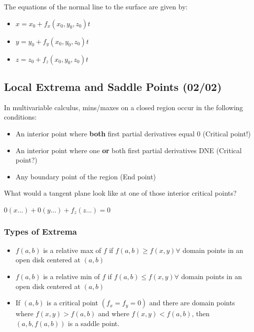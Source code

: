 \documentclass[
  letterpaper,
  DIV=11,
  numbers=noendperiod]{scrartcl}
\providecommand{\tightlist}{%
  \setlength{\itemsep}{0pt}\setlength{\parskip}{0pt}}\usepackage{longtable,booktabs,array}
\begin{document}
The equations of the normal line to the surface are given by:

\begin{itemize}
\tightlist
\item
  \(x = x_0 + f_x(x_0, y_0, z_0)t\)
\item
  \(y = y_0 + f_y(x_0, y_0, z_0)t\)
\item
  \(z = z_0 + f_z(x_0, y_0, z_0)t\)
\end{itemize}

\newpage{}

\subsection{Local Extrema and Saddle Points
(02/02)}\label{local-extrema-and-saddle-points-0202}

In multivariable calculus, mins/maxes on a closed region occur in the
following conditions:

\begin{itemize}
\tightlist
\item
  An interior point where \textbf{both} first partial derivatives equal
  0 (Critical point!)
\item
  An interior point where one \textbf{or} both first partial derivatives
  DNE (Critical point?)
\item
  Any boundary point of the region (End point)
\end{itemize}

What would a tangent plane look like at one of those interior critical
points?

\(0(x...) + 0(y...)+f_z(z...) = 0\)

\subsubsection{Types of Extrema}\label{types-of-extrema}

\begin{itemize}
\tightlist
\item
  \(f(a, b)\) is a relative max of \(f\) if
  \(f(a, b) \ge f(x, y) \forall\) domain points in an open disk centered
  at \((a, b)\)
\item
  \(f(a, b)\) is a relative min of \(f\) if
  \(f(a, b) \le f(x, y) \forall\) domain points in an open disk centered
  at \((a, b)\)
\item
  If \((a, b)\) is a critical point \((f_x = f_y = 0)\) and there are
  domain points where \(f(x, y) > f(a,b)\) and where
  \(f(x,y) < f(a,b)\), then \((a, b, f(a, b))\) is a saddle point.
\end{itemize}
\end{document}
